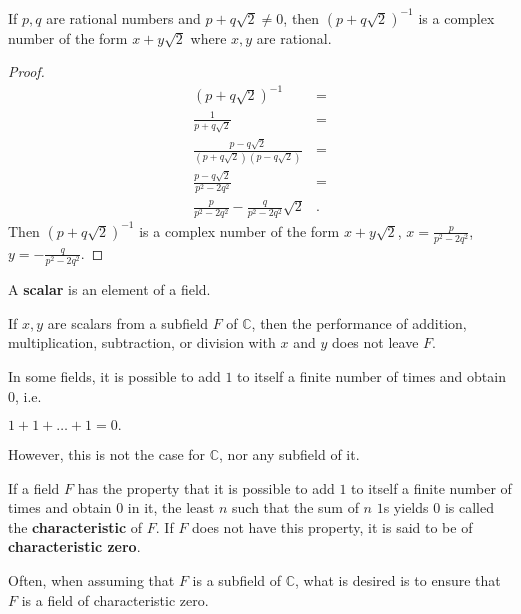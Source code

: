 \documentclass[12pt]{article}
\begin{document}
\begin{lemma}
  If $p,q$ are rational numbers and $p + q\sqrt{2} \neq 0$, then
  $(p + q\sqrt{2})^{-1}$ is a complex number of the form $x +
  y\sqrt{2}$ where $x, y$ are rational.
  \begin{proof}
    \begin{align*}
      (p + q\sqrt{2})^{-1} &=\\
      \frac{1}{p + q\sqrt{2}} &=\\
      \frac{p - q\sqrt{2}}{(p + q\sqrt{2})(p - q\sqrt{2})} &=\\
      \frac{p - q\sqrt{2}}{p^{2} - 2q^{2}} &=\\
      \frac{p}{p^{2} - 2q^{2}} - \frac{q}{p^{2} - 2q^{2}}\sqrt{2}&.
    \end{align*}
    Then $(p + q\sqrt{2})^{-1}$ is a complex number of the form
    $x + y\sqrt{2}$, $x = \frac{p}{p^{2} - 2q^{2}}$, $y =
    -\frac{q}{p^{2} - 2q^{2}}$.
  \end{proof}
\end{lemma}

\begin{defn}
  A \textbf{scalar} is an element of a field.
\end{defn}

\begin{comm}
  If $x, y$ are scalars from a subfield $F$ of $\mathbb{C}$, then
  the performance of addition, multiplication, subtraction, or
  division with $x$ and $y$ does not leave $F$.
\end{comm}

\begin{comm}
  In some fields, it is possible to add $1$ to itself a finite
  number of times and obtain $0$, i.e.
  \begin{center}
    $1 + 1 + … + 1 = 0.$
  \end{center}
  However, this is not the case for $\mathbb{C}$, nor any
  subfield of it.
\end{comm}

\begin{defn}
  If a field $F$ has the property that it is possible to add $1$
  to itself a finite number of times and obtain $0$ in it, the
  least $n$ such that the sum of $n$ $1$s yields $0$ is called
  the \textbf{characteristic} of $F$. If $F$ does not have this
  property, it is said to be of \textbf{characteristic zero}.
\end{defn}

\begin{comm}
  Often, when assuming that $F$ is a subfield of $\mathbb{C}$,
  what is desired is to ensure that $F$ is a field of
  characteristic zero.
\end{comm}
\end{document}
